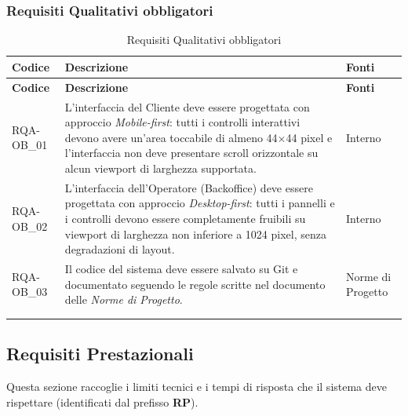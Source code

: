 \subsubsection{Requisiti Qualitativi obbligatori}
\renewcommand{\arraystretch}{1.15}
\begin{longtable}{|>{\raggedright}p{}|>{\raggedright\arraybackslash}p{}|>{\raggedright\arraybackslash}p{}|}

    \hline
    \rowcolor[gray]{0.9}
    \textbf{Codice} & \textbf{Descrizione} & \textbf{Fonti} \\
    \hline
    \endfirsthead
    
    \hline
    \rowcolor[gray]{0.9}
    \textbf{Codice} & \textbf{Descrizione} & \textbf{Fonti}  \\
    \hline
    \endhead

    \hline
    RQA-OB\_01 \hypertarget{rqa-ob_1} & L'interfaccia del Cliente deve essere progettata con approccio \textit{Mobile-first}: tutti i controlli interattivi devono avere un'area toccabile di almeno 44$\times$44 pixel e l'interfaccia non deve presentare scroll orizzontale su alcun viewport di larghezza supportata. & Interno \\
    \hline
    RQA-OB\_02 \hypertarget{rqa-ob_2} & L'interfaccia dell'Operatore (Backoffice) deve essere progettata con approccio \textit{Desktop-first}: tutti i pannelli e i controlli devono essere completamente fruibili su viewport di larghezza non inferiore a 1024 pixel, senza degradazioni di layout. & Interno \\
    \hline
    RQA-OB\_03 \hypertarget{rqa-ob_3} & Il codice del sistema deve essere salvato su Git e documentato seguendo le regole scritte nel documento delle \textit{Norme di Progetto}. & Norme di Progetto \\
    \hline
    \multicolumn{3}{c}{} \\
    \caption{Requisiti Qualitativi obbligatori}\hypertarget{tab:qualitativi_obbligatori}\\
\end{longtable}


\newpage
\subsection{Requisiti Prestazionali}
Questa sezione raccoglie i limiti tecnici e i tempi di risposta che il sistema deve rispettare (identificati dal prefisso \textbf{RP}).

